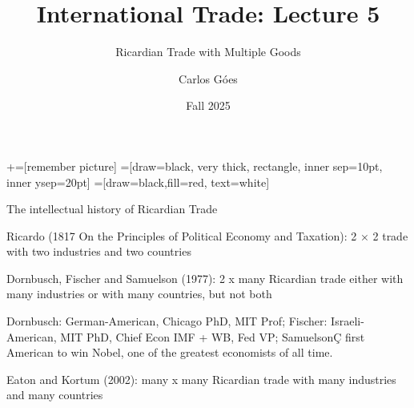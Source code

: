 \documentclass[notes,11pt, aspectratio=169, xcolor=table]{beamer}
\title[]{International Trade: Lecture 5}
\subtitle[]{Ricardian Trade with Multiple Goods}
\author[Góes]
{Carlos Góes\inst{1}}
\date{Fall 2025}
\institute[GWU]{\inst{1} George Washington University }
\newenvironment{wideitemize}{\itemize\addtolength{\itemsep}{10pt}}{\enditemize}
\begin{document}
\newcommand\marktopleft[1]{%
    \tikz[overlay,remember picture] 
        \node (marker-#1-a) at (-.3em,.3em) {};%
}
\newcommand\markbottomright[2]{%
    \tikz[overlay,remember picture] 
        \node (marker-#1-b) at (0em,0em) {};%
}
+=[remember picture] 
 =[draw=black, very thick, rectangle, inner sep=10pt, inner ysep=20pt]
 =[draw=black,fill=red, text=white]















\frame{\titlepage}
\addtocounter{framenumber}{-1}




\begin{frame}{The intellectual history of Ricardian Trade}
\begin{wideitemize}
        \item<1-> Ricardo (1817 On the Principles of Political Economy and Taxation): 2 × 2 trade with two industries and two countries
        \item<2-> Dornbusch, Fischer and Samuelson (1977): 2 x many Ricardian trade either with many industries or with many countries, but not both
        \item<2-> Dornbusch: German-American, Chicago PhD, MIT Prof; Fischer: Israeli-American, MIT PhD, Chief Econ IMF + WB, Fed VP; SamuelsonÇ first American to win Nobel, one of the greatest economists of all time.
        \item<3-> Eaton and Kortum (2002): many x many Ricardian trade with many industries and many countries
        \end{wideitemize}
\end{frame}
\end{document}
